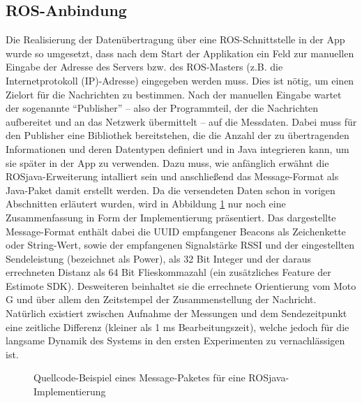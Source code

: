 \subsection{ROS-Anbindung}
Die Realisierung der Datenübertragung über eine ROS-Schnittstelle in der App wurde so umgesetzt, dass nach dem Start der Applikation ein Feld zur manuellen Eingabe der Adresse des Servers bzw. des ROS-Masters (z.B. die Internetprotokoll (IP)-Adresse) eingegeben werden muss. Dies ist nötig, um einen Zielort für die Nachrichten zu bestimmen. Nach der manuellen Eingabe wartet der sogenannte "`Publisher"' -- also der Programmteil, der die Nachrichten aufbereitet und an das Netzwerk übermittelt -- auf die Messdaten. Dabei muss für den Publisher eine Bibliothek bereitstehen, die die Anzahl der zu übertragenden Informationen und deren Datentypen definiert und in Java integrieren kann, um sie später in der App zu verwenden. Dazu muss, wie anfänglich erwähnt die ROSjava-Erweiterung intalliert sein und anschließend das Message-Format als Java-Paket damit erstellt werden. Da die versendeten Daten schon in vorigen Abschnitten erläutert wurden, wird in Abbildung \ref{fig:ROSjavaImpl} nur noch eine Zusammenfassung in Form der Implementierung präsentiert. Das dargestellte Message-Format enthält dabei die UUID empfangener Beacons als Zeichenkette oder String-Wert, sowie der empfangenen Signalstärke RSSI und der eingestellten Sendeleistung (bezeichnet als Power), als 32 Bit Integer und der daraus errechneten Distanz als 64 Bit Flieskommazahl (ein zusätzliches Feature der Estimote SDK). Desweiteren beinhaltet sie die errechnete Orientierung vom Moto G und über allem den Zeitstempel der Zusammenstellung der Nachricht. Natürlich existiert zwischen Aufnahme der Messungen und dem Sendezeitpunkt eine zeitliche Differenz (kleiner als 1 ms Bearbeitungszeit), welche jedoch für die langsame Dynamik des Systems in den ersten Experimenten zu vernachlässigen ist. 
\begin{figure}[H]
\centering
{}
\caption{Quellcode-Beispiel eines Message-Paketes für eine ROSjava-Implementierung}
\label{fig:ROSjavaImpl}
\end{figure}
